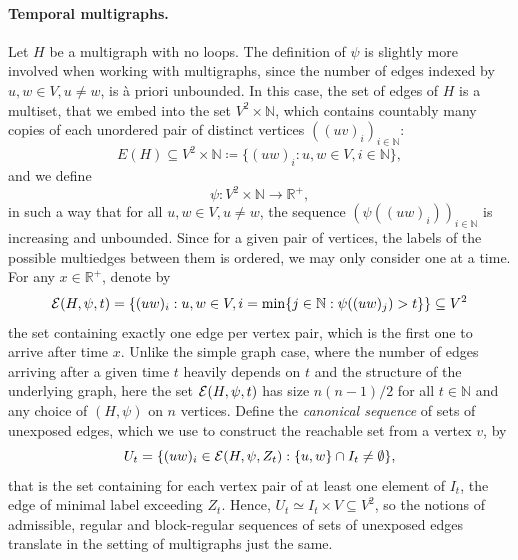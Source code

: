\documentclass[11pt]{article}
\numberwithin{equation}{section}
\theoremstyle{definition}
\newcommand\bN{{\mathbb N}}
\newcommand\bR{{\mathbb R}}
\newcommand\cE{{\cal{E}}}
\begin{document}
\paragraph{Temporal multigraphs.}Let $H$ be a multigraph with no loops. The definition of $\psi$ is slightly more involved when working with multigraphs, since the number of edges indexed by $u,w \in V, u\neq w$, is \` a priori unbounded. In this case, the set of edges of $H$ is a multiset, that we embed into the set $V^2\times{\bN}$, which contains countably many copies of each unordered pair of distinct vertices $((uv)_{i})_{i\in \bN}$: 
$$E(H)\subseteq V^2\times \bN \coloneqq \{(uw)_i : u,w\in V, i\in \bN\},$$ 
and we define 
$$\psi : V^2\times\bN \to \bR^+,$$ 
in such a way that for all $u,w \in V, u\neq w$, the sequence $(\psi((uw)_i))_{i\in \bN}$ is increasing and unbounded. Since for a given pair of vertices, the labels of the possible multiedges between them is ordered, we may only consider one at a time. For any $x\in \bR^+$, denote by
$$\cE(H,\psi, t) = \{(uw)_i: u,w \in V, i = \min\{j\in \bN :  \psi((uw)_j) > t \} \} \subseteq V^2$$ 
the set containing exactly one edge per vertex pair, which is the first one to arrive after time $x$. Unlike the simple graph case, where the number of edges arriving after a given time $t$ heavily depends on $t$ and the structure of the underlying graph, here the set $\cE(H,\psi,t)$ has size $n(n-1)/2$ for all $t\in \mathbb{N}$ and any choice of $(H,\psi)$ on $n$ vertices. Define the \emph{canonical sequence} of sets of unexposed edges, which we use to construct the reachable set from a vertex $v$, by
$$ U_t = \{(uw)_i \in \cE(H,\psi,Z_t) : \{u,w\}\cap I_t \neq \emptyset\},$$
that is the set containing for each vertex pair of at least one element of $I_t$, the edge of minimal label exceeding $Z_t$. Hence, $U_t \simeq I_t \times V \subseteq V^2$, so the notions of admissible, regular and block-regular sequences of sets of unexposed edges translate in the setting of multigraphs just the same. \\
\end{document}
